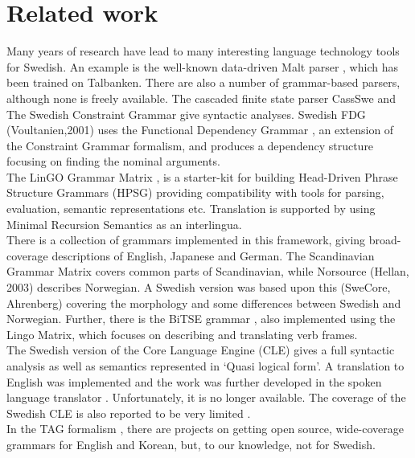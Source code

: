 \documentclass[10pt, a4paper]{article}
\begin{document}
\section{Related work}
Many years of research have lead to many interesting language
technology tools for Swedish.
An example is the well-known data-driven Malt parser \cite{malt},
which has been trained on Talbanken. 
There are also a number of grammar-based parsers, although none is freely available.
The cascaded finite state parser CassSwe \cite{casswe} and
The Swedish Constraint Grammar \cite{birn}
give syntactic analyses. 
Swedish FDG (Voultanien,2001) uses the Functional Dependency Grammar
\cite{fdg},
an extension of the Constraint Grammar
formalism, and produces a dependency structure focusing on finding the nominal
arguments. \\
The LinGO Grammar Matrix \cite{matrix}, is a starter-kit for building
Head-Driven Phrase Structure Grammars \cite{hpsg} (HPSG) providing
compatibility with tools for parsing, evaluation, semantic representations etc.
Translation is supported by using Minimal Recursion
Semantics \cite{mrs} as an interlingua. \\
There is a collection of grammars implemented in this framework, giving broad-coverage
descriptions of 
English, Japanese and German. 
The Scandinavian Grammar Matrix \cite{scandmatrix} covers common parts of
Scandinavian, while Norsource (Hellan, 2003) describes Norwegian. A Swedish version
was based upon this (SweCore, Ahrenberg) covering the morphology and some
differences between Swedish and Norwegian. Further, there is the BiTSE 
grammar \cite{stymne}, also implemented using the Lingo Matrix,
which focuses on describing and translating verb frames.\\ 


The Swedish version of the Core Language Engine (CLE) \cite{gamback}
gives a full syntactic analysis as well as semantics represented in `Quasi logical form'. A
translation to English  was implemented and the work was further developed in the spoken
language translator \cite{spoken}. Unfortunately, it is no longer available. The coverage of the Swedish
CLE is also reported to be very limited \cite[p. 134]{nivreTrees}.\\

In the TAG formalism \cite{tag}, there are projects on getting open source, wide-coverage grammars
for English and Korean, but, to our knowledge, not for Swedish.  \\
\end{document}
